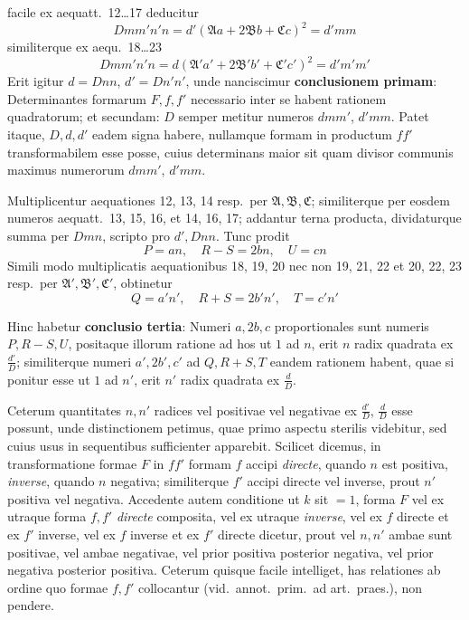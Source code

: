 \documentclass[12pt,a4paper]{article}
\theoremstyle{plain}
\theoremstyle{definition}
\theoremstyle{remark}
\theoremstyle{problemstyle}
\begin{document}
facile ex aequatt.\ 12\ldots 17 deducitur
\[
Dmm'n'n = d'(\mathfrak{A}a + 2\mathfrak{B}b + \mathfrak{C}c)^2 = d'mm
\]
similiterque ex aequ.\ 18\ldots 23
\[
Dmm'n'n = d(\mathfrak{A}'a' + 2\mathfrak{B}'b' + \mathfrak{C}'c')^2 = d'm'm'
\]
Erit igitur $d = Dnn$, $d' = Dn'n'$, unde nanciscimur \textbf{conclusionem primam}: Determinantes formarum $F, f, f'$ necessario inter se habent rationem quadratorum; et secundam: $D$ semper metitur numeros $dmm'$, $d'mm$. Patet itaque, $D, d, d'$ eadem signa habere, nullamque formam in productum $ff'$ transformabilem esse posse, cuius determinans maior sit quam divisor communis maximus numerorum $dmm'$, $d'mm$.

Multiplicentur aequationes 12, 13, 14 resp.\ per $\mathfrak{A}, \mathfrak{B}, \mathfrak{C}$; similiterque per eosdem numeros aequatt.\ 13, 15, 16, et 14, 16, 17; addantur terna producta, dividaturque summa per $Dmn$, scripto pro $d', Dnn$. Tunc prodit
\[
P = an, \quad R - S = 2bn, \quad U = cn
\]
Simili modo multiplicatis aequationibus 18, 19, 20 nec non 19, 21, 22 et 20, 22, 23 resp.\ per $\mathfrak{A}', \mathfrak{B}', \mathfrak{C}'$, obtinetur
\[
Q = a'n', \quad R + S = 2b'n', \quad T = c'n'
\]

Hinc habetur \textbf{conclusio tertia}: Numeri $a, 2b, c$ proportionales sunt numeris $P, R-S, U$, positaque illorum ratione ad hos ut $1$ ad $n$, erit $n$ radix quadrata ex $\frac{d'}{D}$; similiterque numeri $a', 2b', c'$ ad $Q, R+S, T$ eandem rationem habent, quae si ponitur esse ut $1$ ad $n'$, erit $n'$ radix quadrata ex $\frac{d}{D}$.

Ceterum quantitates $n, n'$ radices vel positivae vel negativae ex $\frac{d'}{D}$, $\frac{d}{D}$ esse possunt, unde distinctionem petimus, quae primo aspectu sterilis videbitur, sed cuius usus in sequentibus sufficienter apparebit. Scilicet dicemus, in transformatione formae $F$ in $ff'$ formam $f$ accipi \emph{directe}, quando $n$ est positiva, \emph{inverse}, quando $n$ negativa; similiterque $f'$ accipi directe vel inverse, prout $n'$ positiva vel negativa. Accedente autem conditione ut $k$ sit $=1$, forma $F$ vel ex utraque forma $f, f'$ \emph{directe} composita, vel ex utraque \emph{inverse}, vel ex $f$ directe et ex $f'$ inverse, vel ex $f$ inverse et ex $f'$ directe dicetur, prout vel $n, n'$ ambae sunt positivae, vel ambae negativae, vel prior positiva posterior negativa, vel prior negativa posterior positiva. Ceterum quisque facile intelliget, has relationes ab ordine quo formae $f, f'$ collocantur (vid.\ annot.\ prim.\ ad art.\ praes.), non pendere.
\end{document}
